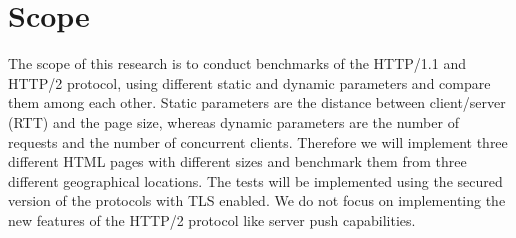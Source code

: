 \section{Scope}
\label{scope}
The scope of this research is to conduct benchmarks of the HTTP/1.1 and HTTP/2 protocol, using different static and dynamic parameters and compare them among each other. Static parameters are the distance between client/server (RTT) and the page size, whereas dynamic parameters are the number of requests and the number of concurrent clients. Therefore we will implement three different HTML pages with different sizes and benchmark them from three different geographical locations. The tests will be implemented using the secured version of the protocols with TLS enabled. We do not focus on implementing the new features of the HTTP/2 protocol like server push capabilities.  
